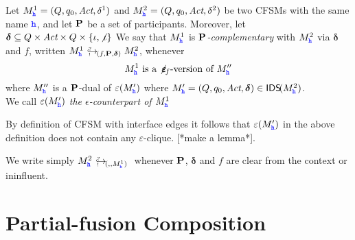 \begin{definition}
\label{def:Pcomplementarity}
Let $M^1_\hh = (Q, q_0, \textit{Act}, \delta^1)$ and 
$M^2_\hh = (Q, q_0, \textit{Act}, \delta^2)$  
be two CFSMs with the same name $\hh$, and let $\roles$ be a set of participants.
Moreover, let $\bm{\delta} \subseteq Q\times\textit{Act}\times Q \times \Set{\intf,\nintf}$
We say that
$M^1_\hh$ is {\em $\roles$-complementary} with $M^2_\hh$ via $\bm{\delta}$ and $f$, written $\emb{f}{\roles}{\bm{\delta}}{M^1_\hh}{M^2_\hh}$, whenever 
$$M^1_\hh \text{ is a $\noeps_{\!f}$-version of } M''_\hh$$
where $M''_\hh$ is a $\roles$-dual of $\varepsilon(M'_\hh)$ where $M'_\hh= (Q, q_0, \textit{Act}, \bm{\delta})\in\IDS(M^2_\hh)$.\\
We call $\varepsilon(M'_\hh)$ {\em the $\epsilon$-counterpart of $M^1_\hh$}
\end{definition}

By definition of CFSM with interface edges it follows that $\varepsilon(M'_\hh)$ in the above definition
does not contain any $\varepsilon$-clique. [*make a lemma*].

We write simply $\emb{}{\bm{}}{M^1_\hh}{M^2_\hh}$ whenever
$\roles$, $\bm\delta$ and $f$ are clear from the context or ininfluent.




\section{Partial-fusion Composition}



